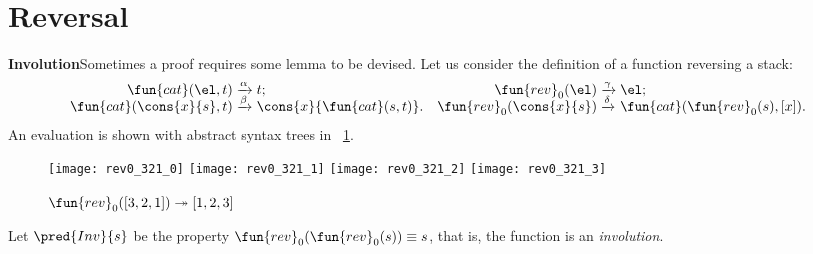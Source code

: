\section{Reversal}
\label{sec:reversal}


\textbf{Involution}\quad Sometimes a
proof requires some lemma to be devised. Let us consider the
definition of a function
\label{def:rev0}
reversing a stack:
\begin{equation*}
\begin{array}{@{}r@{\;}l@{\;}lr@{\;}l@{\;}l@{}}
  \fun{cat}(\el,t)\index{cat@\fun{cat/2}}
& \xrightarrow{\smash{\alpha}} & t;
& \fun{rev}_0(\el)
& \xrightarrow{\smash{\gamma}} & \el;\\
  \fun{cat}(\cons{x}{s},t)
& \xrightarrow{\smash{\beta}} & \cons{x}{\fun{cat}(s,t)}.
& \fun{rev}_0(\cons{x}{s})
& \xrightarrow{\smash{\delta}} & \fun{cat}(\fun{rev}_0(s),[x]).
\end{array}
\end{equation*}
An evaluation is shown with abstract syntax trees in
\fig~\ref{fig:rev0_321}.
\begin{figure}[!b]
\centering
\texttt{[image: rev0\_321\_0]}
\texttt{[image: rev0\_321\_1]}
\texttt{[image: rev0\_321\_2]}
\texttt{[image: rev0\_321\_3]}
\caption{\(\fun{rev}_0([3,2,1]) \twoheadrightarrow [1,2,3]\)}
\label{fig:rev0_321}
\end{figure}
Let \(\pred{Inv}{s}\) be the property
\(\fun{rev}_0(\fun{rev}_0(s)) \equiv s\), that is, the function
 is an
\emph{involution}.

